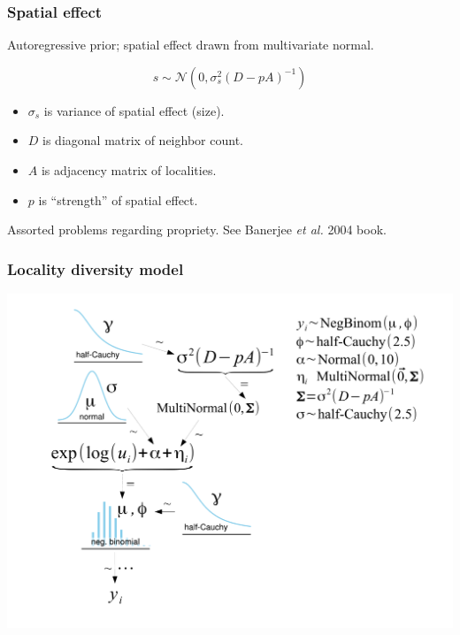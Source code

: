 \documentclass{beamer}
\begin{document}
\begin{frame}
  \frametitle{Spatial effect}

  \begin{definition}
    Autoregressive prior; spatial effect drawn from multivariate normal.

    \begin{equation*}
      s \sim \mathcal{N}(0, \sigma_{s}^{2}(D - pA)^{-1})
    \end{equation*}

    \begin{itemize}
      \item \(\sigma_{s}\) is variance of spatial effect (size).
      \item \(D\) is diagonal matrix of neighbor count.
      \item \(A\) is adjacency matrix of localities.
      \item \(p\) is ``strength'' of spatial effect.
    \end{itemize}

    \tiny{Assorted problems regarding propriety. See Banerjee \textit{et al.} 2004 book.}

  \end{definition}
\end{frame}

\begin{frame}
  \frametitle{Locality diversity model}
  \begin{center}
    \includegraphics[height = 0.8\textheight, width = \textwidth,  keepaspectratio = true]{figure/mammal_locality_model}
  \end{center}
\end{frame}
\end{document}
